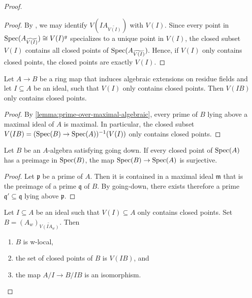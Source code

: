 \begin{proof}
\begin{proof}
    By , we may identify $V(IA_{\widetilde{V(I)}})$ with
    $V(I)$.
    Since every point in
    $\mathrm{Spec}(A_{\widetilde{V(I)}}) \cong V(I)^g$ specializes to a unique point in $V(I)$,
    the closed subset $V(I)$ contains all closed points of $\mathrm{Spec}(A_{\widetilde{V(I)}})$. Hence,
    if $V(I)$ only contains closed points, the closed points are exactly $V(I)$.
\end{proof}

\begin{lemma}
    Let $A \to B$ be a ring map that induces algebraic extensions on residue fields
    and let $I \subseteq A$ be an ideal, such that $V(I)$ only contains closed points.
    Then $V(IB)$ only contains closed points.
    \label{lemma:preimage-closed-points-algebraic}
\end{lemma}

\begin{proof}
    By \ref{lemma:prime-over-maximal-algebraic}, every prime of $B$ lying above a maximal ideal of $A$
    is maximal. In particular, the closed subset $V(I B) = (\mathrm{Spec}(B) \to \mathrm{Spec}(A))^{-1}(V(I))$ only contains
    closed points.
\end{proof}

\begin{lemma}
    Let $B$ be an $A$-algebra satisfying going down. If every closed point of $\mathrm{Spec}(A)$
    has a preimage in $\mathrm{Spec}(B)$, the map $\mathrm{Spec}(B) \to \mathrm{Spec}(A)$ is surjective.
    \label{lemma:going-down-surjective-of-closed}
\end{lemma}

\begin{proof}
    Let $\mathfrak{p}$ be a prime of $A$. Then it is contained in a maximal ideal $\mathfrak{m}$
    that is the preimage of a prime $\mathfrak{q}$ of $B$. By going-down, there
    exists therefore a prime $\mathfrak{q}' \subseteq \mathfrak{q}$ lying above $\mathfrak{p}$.
\end{proof}

\begin{lemma}
    Let $I \subseteq A$ be an ideal such that $V(I) \subseteq A$ only contains closed points.
    Set $B = (A_w)_{\widetilde{V(IA_{w})}}$. Then
    \begin{enumerate}
        \item $B$ is w-local,
        \item the set of closed points of $B$ is $V(IB)$, and
        \item the map $A / I \to B / I B$ is an isomorphism.
    \end{enumerate}
    \label{lemma:w-local-tilde-w-local}
\end{lemma}


\end{proof}
